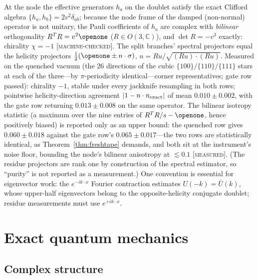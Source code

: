 \documentclass[aps,prd,twocolumn,superscriptaddress,nofootinbib,floatfix]{revtex4-2}
\newcommand{\evM}{\textnormal{\textsc{[machine-checked]}}}
\newcommand{\evX}{\textnormal{\textsc{[measured]}}}
\begin{document}
At the node the effective generators $h_a$ on the doublet satisfy the exact
Clifford algebra $\{h_a,h_b\}=2v^2\delta_{ab}$; because the node frame of
the damped (non-normal) operator is not unitary, the Pauli coefficients of
$h_a$ are complex with \emph{bilinear} orthogonality
$R^TR=v^2\openone$ ($R\in O(3,\mathbb C)$), and
$\det R=-v^3$ exactly: chirality $\chi=-1$ \evM{}. The split branches'
spectral projectors equal the helicity projectors
$\tfrac12(\openone\pm n\cdot\sigma)$, $n=Ru/\sqrt{(Ru)\!\cdot\!(Ru)}$.
Measured on the quenched vacuum (the 26 directions of the cubic
$\{100\}/\{110\}/\{111\}$ stars at each of the three---by
$\pi$-periodicity identical---corner representatives; gate row passed):
chirality $-1$, stable under every jackknife resampling in both rows;
pointwise helicity-direction agreement $|1-n\cdot n_{\rm exact}|$ of
mean $0.010\pm0.002$, with the gate row returning $0.013\pm0.008$ on
the same operator. The bilinear isotropy statistic (a maximum over the
nine entries of $R^TR/s-\openone$, hence positively biased) is reported
only as an upper bound: the quenched row gives $0.060\pm0.018$ against
the gate row's $0.065\pm0.017$---the two rows are statistically
identical, as Theorem~\ref{thm:freshtape} demands, and both sit at the
instrument's noise floor, bounding the node's bilinear anisotropy at
$\lesssim0.1$ \evX{}. (The residue
projectors are rank one by construction of the spectral estimator, so
``purity'' is not reported as a measurement.) One convention is essential for eigenvector work: the
$e^{-ik\cdot x}$ Fourier contraction estimates $U(-k)=\bar U(k)$, whose
upper-half eigenvectors belong to the opposite-helicity conjugate doublet;
residue measurements must use $e^{+ik\cdot x}$.

\section{Exact quantum mechanics}
\label{sec:exactqm}

\subsection{Complex structure}
\end{document}
